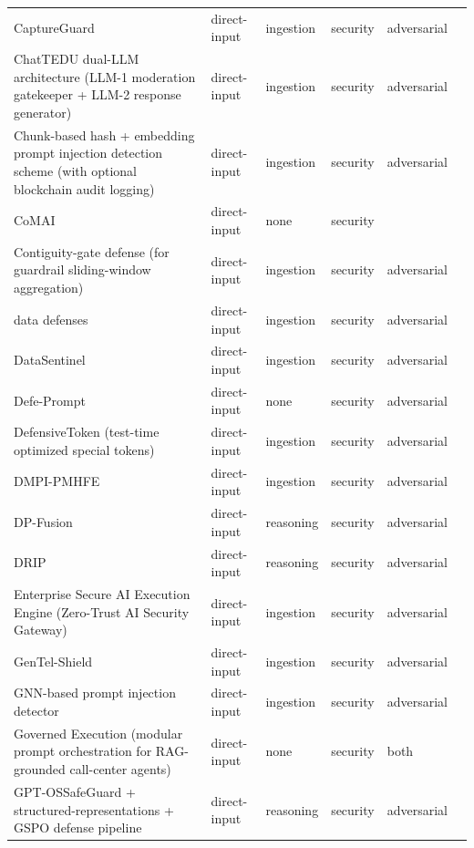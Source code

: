 \begin{longtable}{@{}>{\raggedright\arraybackslash}p{}lllll@{}}
CaptureGuard & direct-input & ingestion & security & adversarial & \cite{kholkar-2025-capture} \\
ChatTEDU dual-LLM architecture (LLM-1 moderation gatekeeper + LLM-2 response generator) & direct-input & ingestion & security & adversarial & \cite{emekci-2025-securing} \\
Chunk-based hash + embedding prompt injection detection scheme (with optional blockchain audit logging) & direct-input & ingestion & security & adversarial & \cite{hao-2025-privacypreserving} \\
CoMAI & direct-input & none & security &  & \cite{sun-2026-comai} \\
Contiguity-gate defense (for guardrail sliding-window aggregation) & direct-input & ingestion & security & adversarial & \cite{zhou-2026-prompt} \\
data defenses & direct-input & ingestion & security & adversarial & \cite{agnew-2024-data} \\
DataSentinel & direct-input & ingestion & security & adversarial & \cite{liu-2025-datasentinel} \\
Defe-Prompt & direct-input & none & security & adversarial & \cite{ren-2024-f2a} \\
DefensiveToken (test-time optimized special tokens) & direct-input & ingestion & security & adversarial & \cite{chen-2025-defending} \\
DMPI-PMHFE & direct-input & ingestion & security & adversarial & \cite{ji-2025-detection} \\
DP-Fusion & direct-input & reasoning & security & adversarial & \cite{thareja-2025-dpfusion} \\
DRIP & direct-input & reasoning & security & adversarial & \cite{liu-2025-drip} \\
Enterprise Secure AI Execution Engine (Zero-Trust AI Security Gateway) & direct-input & ingestion & security & adversarial & \cite{krishna-2026-enterprise} \\
GenTel-Shield & direct-input & ingestion & security & adversarial & \cite{li-2024-gentelsafe} \\
GNN-based prompt injection detector & direct-input & ingestion & security & adversarial & \cite{jadhav-2025-novel} \\
Governed Execution (modular prompt orchestration for RAG-grounded call-center agents) & direct-input & none & security & both & \cite{pachtrachai-2026-transcripts} \\
GPT-OSSafeGuard + structured-representations + GSPO defense pipeline & direct-input & reasoning & security & adversarial & \cite{gudinorosero-2025-prompt} \\

\end{longtable}
